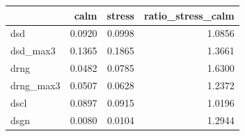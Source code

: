 \begin{tabular}{lrrr}
\toprule
 & calm & stress & ratio_stress_calm \\
\midrule
dsd & 0.0920 & 0.0998 & 1.0856 \\
dsd_max3 & 0.1365 & 0.1865 & 1.3661 \\
drng & 0.0482 & 0.0785 & 1.6300 \\
drng_max3 & 0.0507 & 0.0628 & 1.2372 \\
dscl & 0.0897 & 0.0915 & 1.0196 \\
dsgn & 0.0080 & 0.0104 & 1.2944 \\
\bottomrule
\end{tabular}
